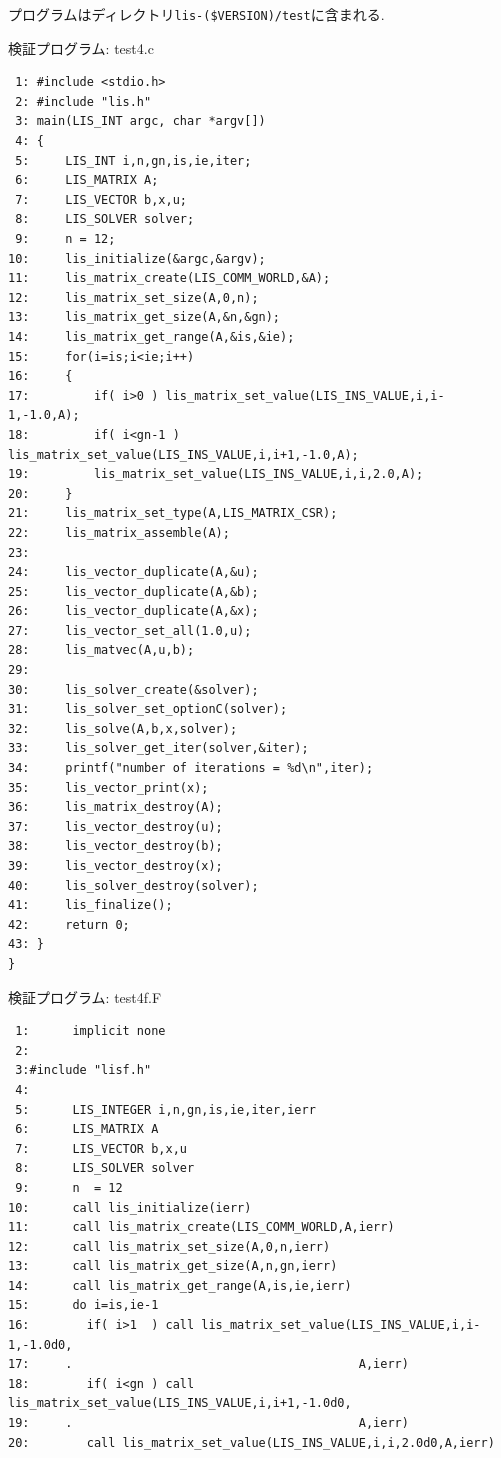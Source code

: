 \documentclass[a4paper]{jarticle}
\begin{document}
{{プログラムはディレクトリ\verb|lis-($VERSION)/test|に含まれる. 
\begin{itembox}[l]{検証プログラム: test4.c}
{\small
\begin{verbatim}
 1: #include <stdio.h> 
 2: #include "lis.h" 
 3: main(LIS_INT argc, char *argv[]) 
 4: { 
 5:     LIS_INT i,n,gn,is,ie,iter; 
 6:     LIS_MATRIX A; 
 7:     LIS_VECTOR b,x,u; 
 8:     LIS_SOLVER solver; 
 9:     n = 12; 
10:     lis_initialize(&argc,&argv); 
11:     lis_matrix_create(LIS_COMM_WORLD,&A); 
12:     lis_matrix_set_size(A,0,n); 
13:     lis_matrix_get_size(A,&n,&gn);
14:     lis_matrix_get_range(A,&is,&ie);
15:     for(i=is;i<ie;i++) 
16:     { 
17:         if( i>0 ) lis_matrix_set_value(LIS_INS_VALUE,i,i-1,-1.0,A); 
18:         if( i<gn-1 ) lis_matrix_set_value(LIS_INS_VALUE,i,i+1,-1.0,A); 
19:         lis_matrix_set_value(LIS_INS_VALUE,i,i,2.0,A); 
20:     } 
21:     lis_matrix_set_type(A,LIS_MATRIX_CSR); 
22:     lis_matrix_assemble(A); 
23:  
24:     lis_vector_duplicate(A,&u); 
25:     lis_vector_duplicate(A,&b); 
26:     lis_vector_duplicate(A,&x); 
27:     lis_vector_set_all(1.0,u); 
28:     lis_matvec(A,u,b); 
29:  
30:     lis_solver_create(&solver); 
31:     lis_solver_set_optionC(solver); 
32:     lis_solve(A,b,x,solver); 
33:     lis_solver_get_iter(solver,&iter); 
34:     printf("number of iterations = %d\n",iter); 
35:     lis_vector_print(x); 
36:     lis_matrix_destroy(A); 
37:     lis_vector_destroy(u); 
38:     lis_vector_destroy(b); 
39:     lis_vector_destroy(x); 
40:     lis_solver_destroy(solver); 
41:     lis_finalize(); 
42:     return 0; 
43: } 
}
\end{verbatim}
}
\end{itembox}
\begin{itembox}[l]{検証プログラム: test4f.F}
{\small
\begin{verbatim}
 1:      implicit none
 2:      
 3:#include "lisf.h"
 4:
 5:      LIS_INTEGER i,n,gn,is,ie,iter,ierr
 6:      LIS_MATRIX A
 7:      LIS_VECTOR b,x,u
 8:      LIS_SOLVER solver
 9:      n  = 12
10:      call lis_initialize(ierr)
11:      call lis_matrix_create(LIS_COMM_WORLD,A,ierr)
12:      call lis_matrix_set_size(A,0,n,ierr)
13:      call lis_matrix_get_size(A,n,gn,ierr)
14:      call lis_matrix_get_range(A,is,ie,ierr)
15:      do i=is,ie-1
16:        if( i>1  ) call lis_matrix_set_value(LIS_INS_VALUE,i,i-1,-1.0d0,
17:     .                                        A,ierr)
18:        if( i<gn ) call lis_matrix_set_value(LIS_INS_VALUE,i,i+1,-1.0d0,
19:     .                                        A,ierr)
20:        call lis_matrix_set_value(LIS_INS_VALUE,i,i,2.0d0,A,ierr)

\end{verbatim}}
\end{itembox}}}
\end{document}
